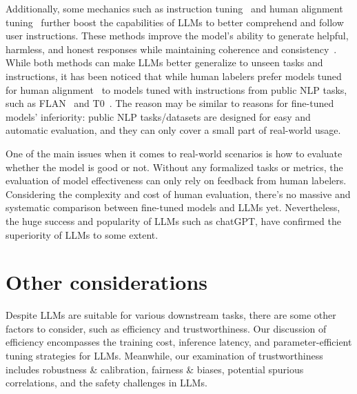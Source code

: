 \documentclass[manuscript,screen, nonacm]{acmart}
\begin{document}
Additionally, some mechanics such as instruction tuning~\cite{wei2021finetuned, sanh2021multitask} and human alignment tuning~\cite{ouyang2022training} further boost the capabilities of LLMs to better comprehend and follow user instructions. These methods improve the model's ability to generate helpful, harmless, and honest responses while maintaining coherence and consistency~\cite{wei2021finetuned, sanh2021multitask, ouyang2022training}. While both methods can make LLMs better generalize to unseen tasks and instructions, it has been noticed that while human labelers prefer models tuned for human alignment~\cite{ouyang2022training} to models tuned with instructions from public NLP tasks, such as FLAN~\cite{wei2021finetuned} and T0~\cite{sanh2021multitask}.  The reason may be similar to reasons for fine-tuned models' inferiority: public NLP tasks/datasets are designed for easy and automatic evaluation, and they can only cover a small part of real-world usage.

One of the main issues when it comes to real-world scenarios is how to evaluate whether the model is good or not. Without any formalized tasks or metrics, the evaluation of model effectiveness can only rely on feedback from human labelers. Considering the complexity and cost of human evaluation, there's no massive and systematic comparison between fine-tuned models and LLMs yet. Nevertheless, the huge success and popularity of LLMs such as chatGPT, have confirmed the superiority of LLMs to some extent.




\section{Other considerations}

Despite LLMs are suitable for various downstream tasks, there are some other factors to consider, such as efficiency and trustworthiness. 
Our discussion of efficiency encompasses the training cost, inference latency, and parameter-efficient tuning strategies for LLMs. Meanwhile, our examination of trustworthiness includes robustness \& calibration, fairness \& biases, potential spurious correlations, and the safety challenges in LLMs.
\end{document}
